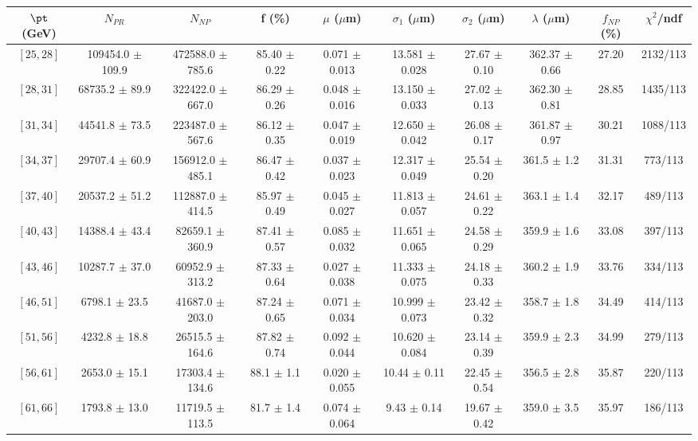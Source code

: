 \begin{tabular}{c||c|c|c|c|c|c|c||c|c}
$\pt$ (GeV) & $N_{PR}$ & $N_{NP}$ & f (\%) & $\mu$ ($\mu$m) & $\sigma_1$ ($\mu$m) & $\sigma_2$ ($\mu$m)  & $\lambda$ ($\mu$m) & $f_{NP}$ (\%) & $\chi^2$/ndf \\
\hline
$[25, 28]$ & 109454.0 $\pm$ 109.9 & 472588.0 $\pm$ 785.6 & 85.40 $\pm$ 0.22 & 0.071 $\pm$ 0.013 & 13.581 $\pm$ 0.028 & 27.67 $\pm$ 0.10 & 362.37 $\pm$ 0.66 & 27.20 & 2132/113\\
$[28, 31]$ & 68735.2 $\pm$ 89.9 & 322422.0 $\pm$ 667.0 & 86.29 $\pm$ 0.26 & 0.048 $\pm$ 0.016 & 13.150 $\pm$ 0.033 & 27.02 $\pm$ 0.13 & 362.30 $\pm$ 0.81 & 28.85 & 1435/113\\
$[31, 34]$ & 44541.8 $\pm$ 73.5 & 223487.0 $\pm$ 567.6 & 86.12 $\pm$ 0.35 & 0.047 $\pm$ 0.019 & 12.650 $\pm$ 0.042 & 26.08 $\pm$ 0.17 & 361.87 $\pm$ 0.97 & 30.21 & 1088/113\\
$[34, 37]$ & 29707.4 $\pm$ 60.9 & 156912.0 $\pm$ 485.1 & 86.47 $\pm$ 0.42 & 0.037 $\pm$ 0.023 & 12.317 $\pm$ 0.049 & 25.54 $\pm$ 0.20 & 361.5 $\pm$ 1.2 & 31.31 & 773/113\\
$[37, 40]$ & 20537.2 $\pm$ 51.2 & 112887.0 $\pm$ 414.5 & 85.97 $\pm$ 0.49 & 0.045 $\pm$ 0.027 & 11.813 $\pm$ 0.057 & 24.61 $\pm$ 0.22 & 363.1 $\pm$ 1.4 & 32.17 & 489/113\\
$[40, 43]$ & 14388.4 $\pm$ 43.4 & 82659.1 $\pm$ 360.9 & 87.41 $\pm$ 0.57 & 0.085 $\pm$ 0.032 & 11.651 $\pm$ 0.065 & 24.58 $\pm$ 0.29 & 359.9 $\pm$ 1.6 & 33.08 & 397/113\\
$[43, 46]$ & 10287.7 $\pm$ 37.0 & 60952.9 $\pm$ 313.2 & 87.33 $\pm$ 0.64 & 0.027 $\pm$ 0.038 & 11.333 $\pm$ 0.075 & 24.18 $\pm$ 0.33 & 360.2 $\pm$ 1.9 & 33.76 & 334/113\\
$[46, 51]$ & 6798.1 $\pm$ 23.5 & 41687.0 $\pm$ 203.0 & 87.24 $\pm$ 0.65 & 0.071 $\pm$ 0.034 & 10.999 $\pm$ 0.073 & 23.42 $\pm$ 0.32 & 358.7 $\pm$ 1.8 & 34.49 & 414/113\\
$[51, 56]$ & 4232.8 $\pm$ 18.8 & 26515.5 $\pm$ 164.6 & 87.82 $\pm$ 0.74 & 0.092 $\pm$ 0.044 & 10.620 $\pm$ 0.084 & 23.14 $\pm$ 0.39 & 359.9 $\pm$ 2.3 & 34.99 & 279/113\\
$[56, 61]$ & 2653.0 $\pm$ 15.1 & 17303.4 $\pm$ 134.6 & 88.1 $\pm$ 1.1 & 0.020 $\pm$ 0.055 & 10.44 $\pm$ 0.11 & 22.45 $\pm$ 0.54 & 356.5 $\pm$ 2.8 & 35.87 & 220/113\\
$[61, 66]$ & 1793.8 $\pm$ 13.0 & 11719.5 $\pm$ 113.5 & 81.7 $\pm$ 1.4 & 0.074 $\pm$ 0.064 & 9.43 $\pm$ 0.14 & 19.67 $\pm$ 0.42 & 359.0 $\pm$ 3.5 & 35.97 & 186/113\\

\end{tabular}
